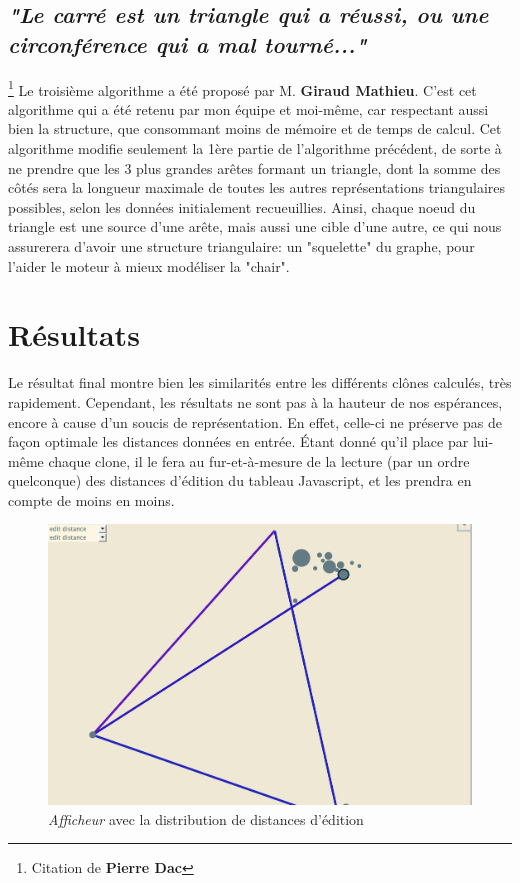 \documentclass[pdftex,12pt,a4paper]{report}
\begin{document}
\begin{spacing}{1.2}
\subsection{\textit{"Le carré est un triangle qui a réussi, ou une circonférence qui a mal tourné..."}}\footnote{Citation de \textbf{Pierre Dac}}
Le troisième algorithme a été proposé par M. \textbf{Giraud Mathieu}. C'est cet algorithme qui a été retenu par mon équipe et moi-même, car respectant aussi bien la structure, que consommant moins de mémoire et de temps de calcul.
\newline
Cet algorithme modifie seulement la 1ère partie de l'algorithme précédent, de sorte à ne prendre que les 3 plus grandes arêtes formant un triangle, dont la somme des côtés sera la longueur maximale de toutes les autres représentations triangulaires possibles, selon les données initialement recueuillies. Ainsi, chaque noeud du triangle est une source d'une arête, mais aussi une cible d'une autre, ce qui nous assurerera d'avoir une structure triangulaire: un "squelette" du graphe, pour l'aider le moteur à mieux modéliser la "chair".

\section{Résultats}

Le résultat final montre bien les similarités entre les différents clônes calculés, très rapidement. Cependant, les résultats ne sont pas à la hauteur de nos espérances, encore à cause d'un soucis de représentation.
En effet, celle-ci ne préserve pas de façon optimale les distances données en entrée. Étant donné qu'il place par lui-même chaque clone, il le fera au fur-et-à-mesure de la lecture (par un ordre quelconque) des distances d'édition du tableau Javascript, et les prendra en compte de moins en moins.

\begin{figure}[H]
\begin{center}
	\includegraphics[scale=0.5]{img/Edit-Distance-Ex.jpg}
\end{center}
\caption{\textit{Afficheur} avec la distribution de distances d'édition}
\end{figure}


\end{spacing}
\end{document}
